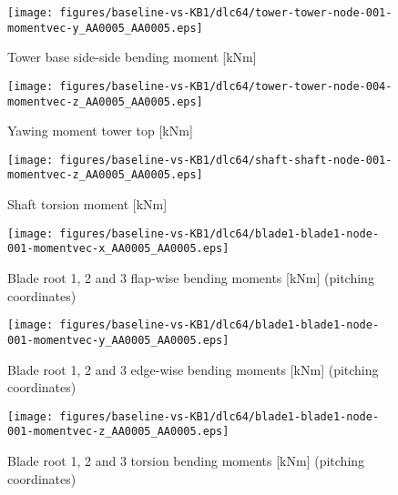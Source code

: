 \begin{figure}[!ht]
\begin{center}
	\texttt{[image: figures/baseline-vs-KB1/dlc64/tower-tower-node-001-momentvec-y\_AA0005\_AA0005.eps]}
\end{center}
\caption{Tower base side-side bending moment [kNm]}
\label{fig:baseline-vs-KB1:dlc64:tower-base-ss}
\end{figure}

\begin{figure}[!ht]
\begin{center}
	\texttt{[image: figures/baseline-vs-KB1/dlc64/tower-tower-node-004-momentvec-z\_AA0005\_AA0005.eps]}
\end{center}
\caption{Yawing moment tower top [kNm]}
\label{fig:baseline-vs-KB1:dlc64:tower-top-yaw}
\end{figure}

\begin{figure}[!ht]
\begin{center}
	\texttt{[image: figures/baseline-vs-KB1/dlc64/shaft-shaft-node-001-momentvec-z\_AA0005\_AA0005.eps]}
\end{center}
\caption{Shaft torsion moment [kNm]}
\label{fig:baseline-vs-KB1:dlc64:shaft-torsion}
\end{figure}

\begin{figure}[!ht]
\begin{center}
	\texttt{[image: figures/baseline-vs-KB1/dlc64/blade1-blade1-node-001-momentvec-x\_AA0005\_AA0005.eps]}
\end{center}
\caption{Blade root 1, 2 and 3 flap-wise bending moments [kNm] (pitching coordinates)}
\label{fig:baseline-vs-KB1:dlc64:blade-root-flap}
\end{figure}

\begin{figure}[!ht]
\begin{center}
	\texttt{[image: figures/baseline-vs-KB1/dlc64/blade1-blade1-node-001-momentvec-y\_AA0005\_AA0005.eps]}
\end{center}
\caption{Blade root 1, 2 and 3 edge-wise bending moments [kNm] (pitching coordinates)}
\label{fig:baseline-vs-KB1:dlc64:blade-root-edge}
\end{figure}

\begin{figure}[!ht]
\begin{center}
	\texttt{[image: figures/baseline-vs-KB1/dlc64/blade1-blade1-node-001-momentvec-z\_AA0005\_AA0005.eps]}
\end{center}
\caption{Blade root 1, 2 and 3 torsion bending moments [kNm] (pitching coordinates)}
\label{fig:baseline-vs-KB1:dlc64:blade-root-torsion}
\end{figure}

